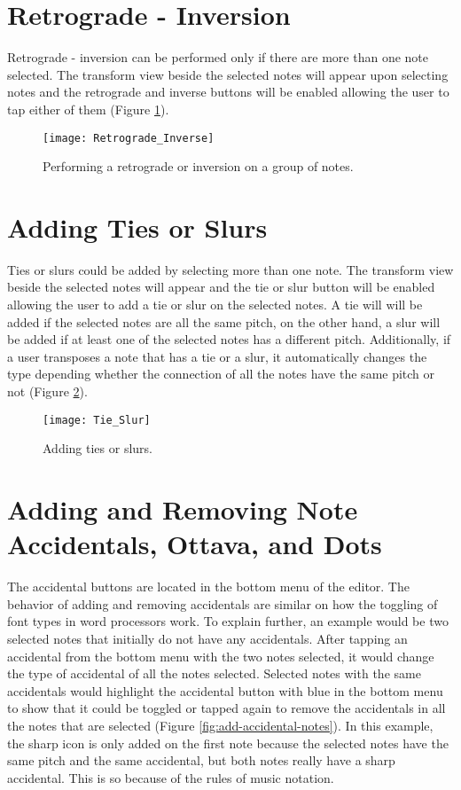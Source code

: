 \section{Retrograde - Inversion}
Retrograde - inversion can be performed only if there are more than one note selected. The transform view beside the selected notes will appear upon selecting notes and the retrograde and inverse buttons will be enabled allowing the user to tap either of them (Figure \ref{fig:r-i}).

\begin{figure}[H]
  \centering
  \texttt{[image: Retrograde\_Inverse]}
    \caption{Performing a retrograde or inversion on a group of notes.}
    \label{fig:r-i}
\end{figure}

\section{Adding Ties or Slurs}
Ties or slurs could be added by selecting more than one note. The transform view beside the selected notes will appear and the tie or slur button will be enabled allowing the user to add a tie or slur on the selected notes. A tie will will be added if the selected notes are all the same pitch, on the other hand, a slur will be added if at least one of the selected notes has a different pitch. Additionally, if a user transposes a note that has a tie or a slur, it automatically changes the type depending whether the connection of all the notes have the same pitch or not (Figure \ref{fig:ties-slur}).

\begin{figure}[H]
  \centering
  \texttt{[image: Tie\_Slur]}
    \caption{Adding ties or slurs.}
    \label{fig:ties-slur}
\end{figure}

\section{Adding and Removing Note Accidentals, Ottava, and Dots}
The accidental buttons are located in the bottom menu of the editor. The behavior of adding and removing accidentals are similar on how the toggling of font types in word processors work. To explain further, an example would be two selected notes that initially do not have any accidentals. After tapping an accidental from the bottom menu with the two notes selected, it would change the type of accidental of all the notes selected. Selected notes with the same accidentals would highlight the accidental button with blue in the bottom menu to show that it could be toggled or tapped again to remove the accidentals in all the notes that are selected (Figure \ref{fig:add-accidental-notes}). In this example, the sharp icon is only added on the first note because the selected notes have the same pitch and the same accidental, but both notes really have a sharp accidental. This is so because of the rules of music notation.

